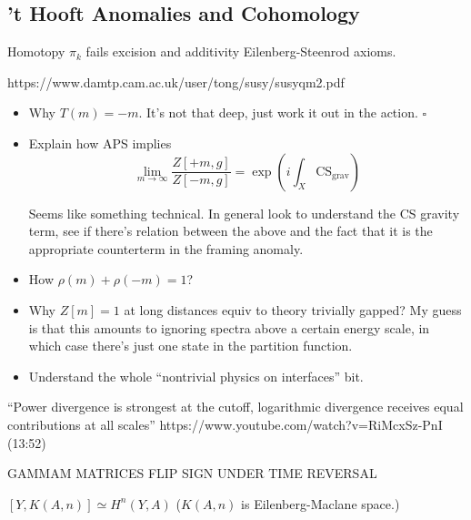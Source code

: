 \documentclass{report}
\begin{document}
\subsection{'t Hooft Anomalies and Cohomology}

Homotopy $ \pi_k $ fails excision and additivity Eilenberg-Steenrod axioms. 

https://www.damtp.cam.ac.uk/user/tong/susy/susyqm2.pdf

\begin{itemize}
	\item Why $ T(m) = -m $. It's not that deep, just work it out in the action.
	$ \square $

	\item Explain how APS implies 
	\begin{equation*}
		\lim_{m \rightarrow \infty}
			\frac{Z[+m, g]}{Z[-m, g]} = \exp\left(i \int_X\text{CS}_\text{grav}\right)
	\end{equation*}

	Seems like something technical. In general look to understand the CS 
	gravity term, see if there's relation between the above and the fact that 
	it is the appropriate counterterm in the framing anomaly.

	\item How $ \rho(m) + \rho(-m) = 1 $? 
	\item Why $ Z[m] = 1 $ at long distances equiv to theory trivially gapped?
	My guess is that this amounts to ignoring spectra above a certain energy 
	scale, in which case there's just one state in the partition function. 
	\item Understand the whole ``nontrivial physics on interfaces'' bit.
\end{itemize}



``Power divergence is strongest at the cutoff, logarithmic divergence receives 
equal contributions at all scales''
https://www.youtube.com/watch?v=RiMcxSz-PnI (13:52)


GAMMAM MATRICES FLIP SIGN UNDER TIME REVERSAL

$ [Y, K(A,n)]\simeq H^n(Y,A) $ ($ K(A,n) $ is Eilenberg-Maclane space.)


\end{document}
